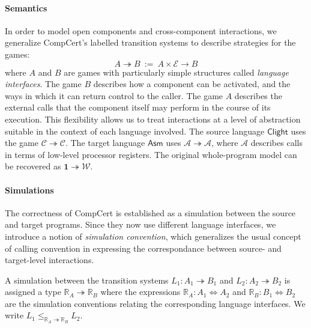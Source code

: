 \documentclass[sigplan,10pt,review,anonymous]{acmart}\settopmatter{printfolios=true,printccs=false,printacmref=false}
\newcommand{\kw}[1]{\ensuremath{ \mathsf{#1} }}
\begin{document}
\paragraph{Semantics} %

In order to model open components and cross-component interactions,
we generalize CompCert's labelled transition systems
to describe strategies for the games:
\[ A \twoheadrightarrow B \: := \:
   A \times \mathcal{E} \rightarrow B \]
where $A$ and $B$ are games with particularly simple structures
called \emph{language interfaces}.
The game $B$ describes how a component can be activated,
and the ways in which it can return control to the caller.
The game $A$ describes the external calls that the component itself
may perform in the course of its execution.
This flexibility allows us to treat interactions
at a level of abstraction suitable in the context of each language involved.
The source language \kw{Clight} uses the game
$\mathcal{C} \twoheadrightarrow \mathcal{C}$.
The target language \kw{Asm} uses
$\mathcal{A} \twoheadrightarrow \mathcal{A}$,
where $\mathcal{A}$ describes calls
in terms of low-level processor registers.
The original whole-program model can be recovered as
$\mathbf{1} \twoheadrightarrow \mathcal{W}$.



\paragraph{Simulations} %

The correctness of CompCert is established as
a simulation between the source and target programs.
Since they now use different language interfaces,
we introduce a notion of \emph{simulation convention},
which generalizes the usual concept of calling convention
in expressing the correspondance between
source- and target-level interactions.

A simulation between the transition systems
$L_1 : A_1 \twoheadrightarrow B_1$ and
$L_2 : A_2 \twoheadrightarrow B_2$
is assigned a type $\mathbb{R}_A \twoheadrightarrow \mathbb{R}_B$
where the expressions
$\mathbb{R}_A : A_1 \Leftrightarrow A_2$ and
$\mathbb{R}_B : B_1 \Leftrightarrow B_2$
are the simulation conventions
relating the corresponding language interfaces.
We write
$L_1 \le_{\mathbb{R}_A \twoheadrightarrow \mathbb{R}_B} L_2$.
\end{document}
